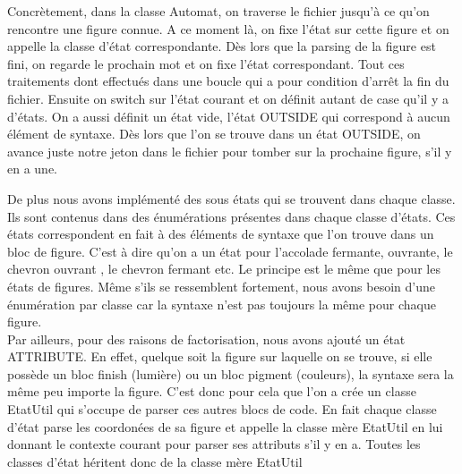 \documentclass[../../Rapport RayTracer]{subfiles}
\begin{document}
Concrètement, dans la classe Automat, on traverse le fichier jusqu'à ce qu'on rencontre une figure connue. A ce moment là, on fixe l'état sur cette figure et on appelle la classe d'état correspondante. Dès lors que la parsing de la figure est fini, on regarde le prochain mot et on fixe l'état correspondant. Tout ces traitements dont effectués dans une boucle qui a pour condition d'arrêt la fin du fichier. Ensuite on switch sur l'état courant et on définit autant de case qu'il y a d'états. On a aussi définit un état vide, l'état OUTSIDE qui correspond à aucun élément de syntaxe. Dès lors que l'on se trouve dans un état OUTSIDE, on avance juste notre jeton dans le fichier pour tomber sur la prochaine figure, s'il y en a une.
\begin{adjustbox}{max width=\textwidth}
 
\end{adjustbox} 
De plus nous avons implémenté des sous états qui se trouvent dans chaque classe. Ils sont contenus dans des énumérations présentes dans chaque classe d'états. Ces états correspondent en fait à des éléments de syntaxe que l'on trouve dans un bloc de figure. C'est à dire qu'on a un état pour l'accolade fermante, ouvrante, le chevron ouvrant , le chevron fermant etc.
Le principe est le même que pour les états de figures. Même s'ils se ressemblent fortement, nous avons besoin d'une énumération par classe car la syntaxe n'est pas toujours la même pour chaque figure.
\\

Par ailleurs, pour des raisons de factorisation, nous avons ajouté un état ATTRIBUTE. En effet, quelque soit la figure sur laquelle on se trouve, si elle possède un bloc finish (lumière) ou un bloc pigment (couleurs), la syntaxe sera la même peu importe la figure. C'est donc pour cela que l'on a crée un classe EtatUtil qui s'occupe de parser ces autres blocs de code. En fait chaque classe d'état parse les coordonées de sa figure et appelle la classe mère EtatUtil en lui donnant le contexte courant pour parser ses attributs s'il y en a. Toutes les classes d'état héritent donc de la classe mère EtatUtil
\end{document}
